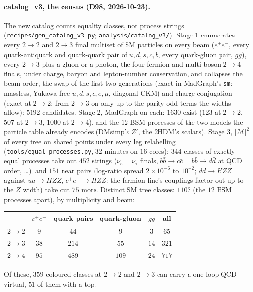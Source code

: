 \documentclass[11pt]{article}
\newcommand{\code}[1]{\texttt{#1}}
\begin{document}
\paragraph{catalog\_v3, the census (D98, 2026-10-23).} The new catalog counts equality classes, not process strings
(\code{recipes/gen\_catalog\_v3.py}; \code{analysis/catalog\_v3/}). Stage 1 enumerates every $2\to2$ and $2\to3$ final
multiset of SM particles on every beam ($e^+e^-$, every quark-antiquark and quark-quark pair of $u,d,s,c,b$, every
quark-gluon pair, $gg$), every $2\to3$ plus a gluon or a photon, the four-fermion and multi-boson $2\to4$ finals, under
charge, baryon and lepton-number conservation, and collapses the beam order, the swap of the first two generations (exact in
MadGraph's \code{sm}: massless, Yukawa-free $u,d,s,c,e,\mu$, diagonal CKM) and charge conjugation (exact at $2\to2$; from
$2\to3$ on only up to the parity-odd terms the widths allow): $5192$ candidates. Stage 2, MadGraph on each: $1630$ exist
($123$ at $2\to2$, $507$ at $2\to3$, $1000$ at $2\to4$), and the $12$ BSM processes of the two models the particle table
already encodes (DMsimp's $Z'$, the 2HDM's scalars). Stage 3, $|\mathcal M|^2$ of every tree on shared points under every
leg relabelling (\code{tools/equal\_processes.py}, $32$ minutes on $16$ cores): $344$ classes of exactly equal processes
take out $452$ strings ($\nu_e=\nu_\tau$ finals, $b\bar b\to c\bar c=b\bar b\to d\bar d$ at QCD order, \dots), and $151$
near pairs (log-ratio spread $2\times10^{-6}$ to $10^{-2}$; $d\bar d\to HZZ$ against $u\bar u\to HZZ$, $e^+e^-\to HZZ$:
the fermion line's couplings factor out up to the $Z$ width) take out $75$ more. Distinct SM tree classes: $1103$ (the $12$ BSM
processes apart), by multiplicity and beam:
\begin{center}
\begin{tabular}{lccccc}
 & $e^+e^-$ & quark pairs & quark-gluon & $gg$ & all \\ \hline
$2\to2$ & $9$ & $44$ & $9$ & $3$ & $65$ \\
$2\to3$ & $38$ & $214$ & $55$ & $14$ & $321$ \\
$2\to4$ & $95$ & $489$ & $109$ & $24$ & $717$ \\
\end{tabular}
\end{center}
Of these, $359$ coloured classes at $2\to2$ and $2\to3$ can carry a one-loop QCD virtual, $51$ of them with a top.
\end{document}
